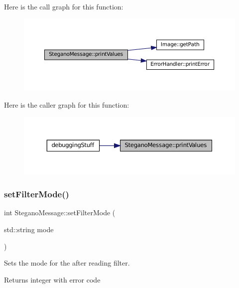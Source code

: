 Here is the call graph for this function\+:\nopagebreak
\begin{figure}[H]
\begin{center}
\leavevmode
\includegraphics[width=350pt]{classSteganoMessage_a3ea3f5ff720bf56d33f168d47e2897b0_cgraph}
\end{center}
\end{figure}
Here is the caller graph for this function\+:\nopagebreak
\begin{figure}[H]
\begin{center}
\leavevmode
\includegraphics[width=350pt]{classSteganoMessage_a3ea3f5ff720bf56d33f168d47e2897b0_icgraph}
\end{center}
\end{figure}
\mbox{\label{classSteganoMessage_a5c3ef910b17f4bbe32a73a33be9d7586}} 
\subsubsection{\texorpdfstring{setFilterMode()}{setFilterMode()}}
{\footnotesize\ttfamily int Stegano\+Message\+::set\+Filter\+Mode (\begin{DoxyParamCaption}\item[{std\+::string}]{mode }\end{DoxyParamCaption})}



Sets the mode for the after reading filter. 

\begin{DoxyReturn}{Returns}
integer with error code 
\end{DoxyReturn}


